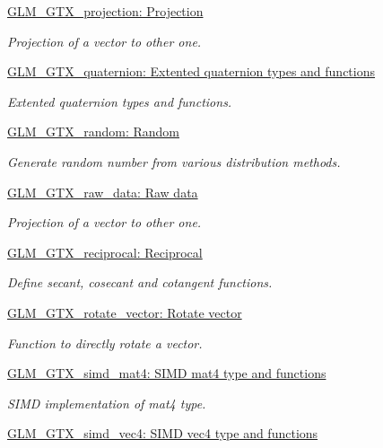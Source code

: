 \begin{DoxyCompactItemize}
\hyperlink{group__gtx__projection}{\-G\-L\-M\-\_\-\-G\-T\-X\-\_\-projection\-: Projection}
\begin{DoxyCompactList}\small\item\em \-Projection of a vector to other one. \end{DoxyCompactList}\item 
\hyperlink{group__gtx__quaternion}{\-G\-L\-M\-\_\-\-G\-T\-X\-\_\-quaternion\-: Extented quaternion types and functions}
\begin{DoxyCompactList}\small\item\em \-Extented quaternion types and functions. \end{DoxyCompactList}\item 
\hyperlink{group__gtx__random}{\-G\-L\-M\-\_\-\-G\-T\-X\-\_\-random\-: Random}
\begin{DoxyCompactList}\small\item\em \-Generate random number from various distribution methods. \end{DoxyCompactList}\item 
\hyperlink{group__gtx__raw__data}{\-G\-L\-M\-\_\-\-G\-T\-X\-\_\-raw\-\_\-data\-: Raw data}
\begin{DoxyCompactList}\small\item\em \-Projection of a vector to other one. \end{DoxyCompactList}\item 
\hyperlink{group__gtx__reciprocal}{\-G\-L\-M\-\_\-\-G\-T\-X\-\_\-reciprocal\-: Reciprocal}
\begin{DoxyCompactList}\small\item\em \-Define secant, cosecant and cotangent functions. \end{DoxyCompactList}\item 
\hyperlink{group__gtx__rotate__vector}{\-G\-L\-M\-\_\-\-G\-T\-X\-\_\-rotate\-\_\-vector\-: Rotate vector}
\begin{DoxyCompactList}\small\item\em \-Function to directly rotate a vector. \end{DoxyCompactList}\item 
\hyperlink{group__gtx__simd__mat4}{\-G\-L\-M\-\_\-\-G\-T\-X\-\_\-simd\-\_\-mat4\-: S\-I\-M\-D mat4 type and functions}
\begin{DoxyCompactList}\small\item\em \-S\-I\-M\-D implementation of mat4 type. \end{DoxyCompactList}\item 
\hyperlink{group__gtx__simd__vec4}{\-G\-L\-M\-\_\-\-G\-T\-X\-\_\-simd\-\_\-vec4\-: S\-I\-M\-D vec4 type and functions}

\end{DoxyCompactItemize}
